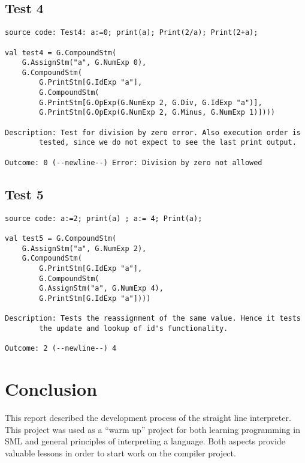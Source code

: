 \documentclass[a4paper]{article}
\begin{document}
\subsection{Test 4}
\begin{lstlisting}
source code: Test4: a:=0; print(a); Print(2/a); Print(2+a);

val test4 = G.CompoundStm(
	G.AssignStm("a", G.NumExp 0),
	G.CompoundStm(
	    G.PrintStm[G.IdExp "a"],
	    G.CompoundStm(
		G.PrintStm[G.OpExp(G.NumExp 2, G.Div, G.IdExp "a")],
		G.PrintStm[G.OpExp(G.NumExp 2, G.Minus, G.NumExp 1)])))

Description: Test for division by zero error. Also execution order is
		tested, since we do not expect to see the last print output.

Outcome: 0 (--newline--) Error: Division by zero not allowed
\end{lstlisting}

\subsection{Test 5}
\begin{lstlisting}
source code: a:=2; print(a) ; a:= 4; Print(a);

val test5 = G.CompoundStm(
	G.AssignStm("a", G.NumExp 2),
	G.CompoundStm(
	    G.PrintStm[G.IdExp "a"],
	    G.CompoundStm(
		G.AssignStm("a", G.NumExp 4),
		G.PrintStm[G.IdExp "a"])))

Description: Tests the reassignment of the same value. Hence it tests
		the update and lookup of id's functionality.

Outcome: 2 (--newline--) 4
\end{lstlisting}



\section{Conclusion}
This report described the development process of the straight line interpreter. This project was used as a ``warm up'' project for both learning programming in SML and general principles of interpreting a language. Both aspects provide valuable lessons in order to start work on the compiler project. 
\end{document}
